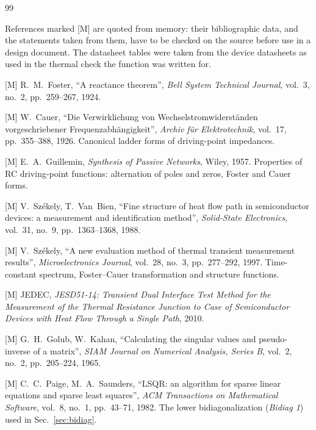 \documentclass[10pt,a4paper]{scrartcl}
\begin{document}
\begin{thebibliography}{99}
\small
\item[] References marked [M] are quoted from memory: their bibliographic data, and the statements taken from them, have to be checked on the source before use in a design document. The datasheet tables were taken from the device datasheets as used in the thermal check the function was written for.

[M] R.~M.~Foster, ``A reactance theorem'', \emph{Bell System Technical Journal}, vol.~3, no.~2, pp.~259--267, 1924.

[M] W.~Cauer, ``Die Verwirklichung von Wechselstromwiderst\"anden vorgeschriebener Frequenzabh\"angigkeit'', \emph{Archiv f\"ur Elektrotechnik}, vol.~17, pp.~355--388, 1926. Canonical ladder forms of driving-point impedances.

[M] E.~A.~Guillemin, \emph{Synthesis of Passive Networks}, Wiley, 1957. Properties of RC driving-point functions: alternation of poles and zeros, Foster and Cauer forms.

[M] V.~Sz\'ekely, T.~Van~Bien, ``Fine structure of heat flow path in semiconductor devices: a measurement and identification method'', \emph{Solid-State Electronics}, vol.~31, no.~9, pp.~1363--1368, 1988.

[M] V.~Sz\'ekely, ``A new evaluation method of thermal transient measurement results'', \emph{Microelectronics Journal}, vol.~28, no.~3, pp.~277--292, 1997. Time-constant spectrum, Foster--Cauer transformation and structure functions.

[M] JEDEC, \emph{JESD51-14: Transient Dual Interface Test Method for the Measurement of the Thermal Resistance Junction to Case of Semiconductor Devices with Heat Flow Through a Single Path}, 2010.

[M] G.~H.~Golub, W.~Kahan, ``Calculating the singular values and pseudo-inverse of a matrix'', \emph{SIAM Journal on Numerical Analysis, Series B}, vol.~2, no.~2, pp.~205--224, 1965.

[M] C.~C.~Paige, M.~A.~Saunders, ``LSQR: an algorithm for sparse linear equations and sparse least squares'', \emph{ACM Transactions on Mathematical Software}, vol.~8, no.~1, pp.~43--71, 1982. The lower bidiagonalization (\emph{Bidiag 1}) used in Sec.~\ref{sec:bidiag}.


\end{thebibliography}
\end{document}
